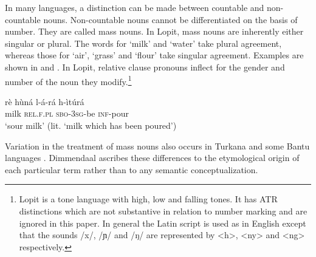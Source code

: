 \documentclass[output=paper]{langsci/langscibook}
\begin{document}
In many languages, a distinction can be made between countable and non-countable nouns. Non-countable nouns cannot be differentiated on the basis of number. They are called mass nouns. In Lopit, mass nouns are inherently either singular or plural.  The words for ‘milk’ and ‘water’ take plural agreement, whereas those for ‘air’, ‘grass’ and ‘flour’ take singular agreement. Examples are shown in  and . In Lopit, relative clause pronouns inflect for the gender and number of the noun they modify.\footnote{Lopit is a tone language with high, low and falling tones. It has ATR distinctions which are not substantive in relation to number marking and are ignored in this paper. In general the Latin script is used as in English except that the sounds /x/, /ɲ/ and /ŋ/ are represented by {\textless}h{\textgreater}, {\textless}ny{\textgreater} and {\textless}ng{\textgreater} respectively.}

\ea\label{ex:moodie:1}
\gll r\`{e} h\`{u}n\'{a} l-\'{a}-r\'{a} h-\`{i}t\'{u}r\'{a} \\
milk \textsc{rel.f.pl} \textsc{sbo-3sg}-be \textsc{inf}-pour \\
\glt ‘sour milk’ (lit. ‘milk which has been poured’)
\z

\ea\label{ex:moodie:2}

\z
\z

Variation in the treatment of mass nouns also occurs in Turkana \citep[224]{Dimmendaal1983} and some Bantu languages \citep[173]{Corbett2000}. Dimmendaal ascribes these differences to the etymological origin of each particular term \citep[230]{Dimmendaal2000} rather than to any semantic conceptualization.
\end{document}
